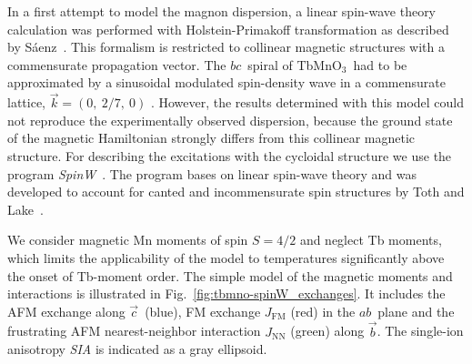 \documentclass[aps,prb,twocolumn,superscriptaddress,showpacs,floatfix]{revtex4-2}
\newcommand{\tbmno}{TbMnO$_3$}
\newcommand{\spinw}{\textit{SpinW}}
\newcommand{\baxis}{$\vec{b}$}
\newcommand{\caxis}{$\vec{c}$}
\newcommand{\abplane}{$ab$}
\newcommand{\bcplane}{$bc$}
\begin{document}
In a first attempt to model the magnon dispersion, a linear spin-wave theory calculation was performed with Holstein-Primakoff transformation as described by S\'aenz~\cite{Saenz1962,Ulbrich2012}. This formalism is restricted to collinear magnetic structures with a commensurate propagation vector. The \bcplane\ spiral of \tbmno\ had to be approximated by a sinusoidal modulated spin-density wave in a commensurate lattice, $\vec{k}=(0,~2/7,~0)$ . However, the results determined with this model could not reproduce the experimentally observed dispersion, because the ground state of the magnetic Hamiltonian strongly differs from this collinear magnetic structure.
For describing the excitations with the cycloidal structure we use the program \spinw~\cite{progspinW}. The program bases on linear spin-wave theory and was developed to account for canted and incommensurate spin structures by Toth and Lake~\cite{Toth2015}.

We consider magnetic Mn moments of spin $S=4/2$ and neglect Tb moments, which limits the applicability of the model to temperatures significantly above the onset of Tb-moment order. The simple model of the magnetic moments and interactions is illustrated in Fig.~\ref{fig:tbmno-spinW_exchanges}. It includes the AFM exchange along \caxis\ (blue), FM exchange $J_{\textrm{FM}}$ (red) in the \abplane\ plane and the frustrating AFM nearest-neighbor interaction $J_{\textrm{NN}}$ (green) along \baxis. The single-ion anisotropy \textit{SIA} is indicated as a gray ellipsoid.
\end{document}
